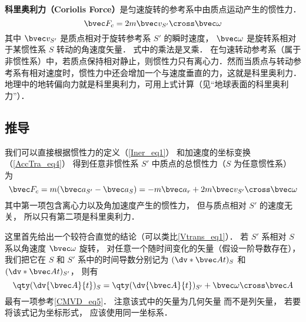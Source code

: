 

\textbf{科里奥利力（Coriolis Force）}是匀速旋转的参考系中由质点运动产生的惯性力．
\begin{equation}
\bvec F_c = 2m \bvec v_{S'} \cross \bvec \omega
\end{equation}
其中 $\bvec v_{S'}$ 是质点相对于旋转参考系 $S'$ 的瞬时速度， $\bvec\omega$ 是旋转系相对于某惯性系 $S$ 转动的角速度矢量．%
式中的乘法是叉乘．
在匀速转动参考系（属于非惯性系）中，若质点保持相对静止，则惯性力只有离心力．然而当质点与转动参考系有相对速度时，惯性力中还会增加一个与速度垂直的力，这就是科里奥利力．地理中的地转偏向力就是科里奥利力，可用上式计算（见“地球表面的科里奥利力”）．

\subsection{推导}
我们可以直接根据惯性力的定义（\autoref{Iner_eq1}） 和加速度的坐标变换（\autoref{AccTra_eq4}） 得到任意非惯性系 $S'$ 中质点的总惯性力（$S$ 为任意惯性系） 为
\begin{equation}
\bvec F_c = m( \bvec a_{S'} - \bvec a_{S} ) = -m\bvec a_{r} + 2 m \bvec v_{S'} \cross  \bvec \omega
\end{equation}
其中第一项包含离心力以及角加速度产生的惯性力， 但与质点相对 $S'$ 的速度无关， 所以只有第二项是科里奥利力．

这里首先给出一个较符合直觉的结论（可以类比\autoref{Vtrans_eq1}）． 若 $S'$ 系相对 $S$ 系以角速度 $\bvec\omega$ 旋转， 对任意一个随时间变化的矢量（假设一阶导数存在）， 我们把它在 $S$ 和 $S'$ 系中的时间导数分别记为 $(\dv*{\bvec A}{t})_{S}$ 和 $(\dv*{\bvec A}{t})_{S'}$， 则有
\begin{equation}\label{Corio_eq4}
\qty(\dv{\bvec A}{t})_{S} = \qty(\dv{\bvec A}{t})_{S'} + \bvec\omega\cross\bvec A
\end{equation}
最有一项参考\autoref{CMVD_eq5}． 注意该式中的矢量为几何矢量 而不是列矢量， 若要将该式记为坐标形式， 应该使用同一坐标系．


